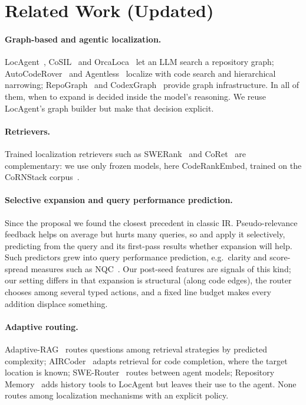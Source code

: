 \documentclass[11pt]{article}
\begin{document}
\section{Related Work (Updated)}

\paragraph{Graph-based and agentic localization.} LocAgent~\citep{chen2025locagent},
CoSIL~\citep{jiang2025cosil} and OrcaLoca~\citep{yu2025orcaloca} let an LLM
search a repository graph; AutoCodeRover~\citep{zhang2024autocoderover} and
Agentless~\citep{xia2024agentless} localize with code search and hierarchical
narrowing; RepoGraph~\citep{ouyang2024repograph} and
CodexGraph~\citep{liu2024codexgraph} provide graph infrastructure. In all of
them, when to expand is decided inside the model's reasoning. We reuse
LocAgent's graph builder but make that decision explicit.

\paragraph{Retrievers.} Trained localization retrievers such as
SWERank~\citep{reddy2026swerank} and CoRet~\citep{fehr2025coret} are
complementary: we use only frozen models, here CodeRankEmbed, trained on the
CoRNStack corpus~\citep{suresh2025cornstack}.

\paragraph{Selective expansion and query performance prediction.} Since the
proposal we found the closest precedent in classic IR. Pseudo-relevance
feedback helps on average but hurts many queries, so
\citet{amati2004query} and \citet{cronen2004selective} apply it selectively,
predicting from the query and its first-pass results whether expansion will
help. Such predictors grew into query performance prediction, e.g.\ clarity
\citep{cronen2002predicting} and score-spread measures such as
NQC~\citep{shtok2012nqc}. Our post-seed features are signals of this kind;
our setting differs in that expansion is structural (along code edges), the
router chooses among several typed actions, and a fixed line budget makes
every addition displace something.

\paragraph{Adaptive routing.} Adaptive-RAG~\citep{jeong2024adaptiverag} routes
questions among retrieval strategies by predicted complexity;
AIRCoder~\citep{shi2026aircoder} adapts retrieval for code completion, where
the target location is known; SWE-Router~\citep{son2026swerouter} routes
between agent models; Repository Memory~\citep{wang2026repomemory} adds
history tools to LocAgent but leaves their use to the agent. None routes among
localization mechanisms with an explicit policy.
\end{document}
